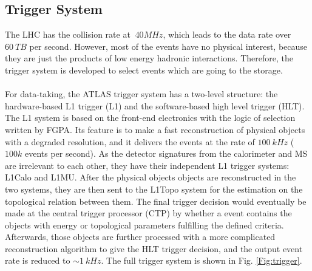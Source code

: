 \subsection{Trigger System}
The LHC has the collision rate at $~40MHz$, which leads to the data rate over $60~TB$ per second. However, most of the events have no physical interest, because they are just the products of low energy hadronic interactions. Therefore, the trigger system is developed to select events which are going to the storage.
\\
\\For data-taking, the ATLAS trigger system has a two-level structure: the hardware-based L1 trigger (L1) and the software-based high level trigger (HLT). The L1 system is based on the front-end electronics with the logic of selection written by FGPA. Its feature is to make a fast reconstruction of physical objects with a degraded resolution, and it delivers the events at the rate of $100~kHz$ ($100k$ events per second). As the detector signatures from the calorimeter and MS are irrelevant to each other, they have their independent L1 trigger systems: L1Calo and L1MU. After the physical objects objects are reconstructed in the two systems, they are then sent to the L1Topo system for the estimation on the topological relation between them. The final trigger decision would eventually be made at the central trigger processor (CTP) by whether a event contains the objects with energy or topological parameters fulfilling the defined criteria. Afterwards, those objects are further processed with a more complicated reconstruction algorithm to give the HLT trigger decision, and the output event rate is reduced to $\sim 1~kHz$. The full trigger system is shown in Fig. \ref{Fig:trigger}.

